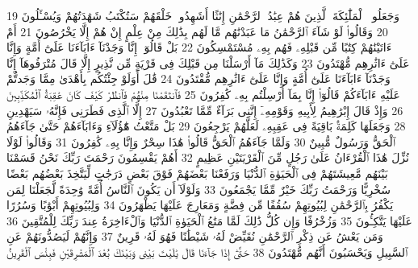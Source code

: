 {\tiny\colorbox{cl_aya}{19}} وَجَعَلُوا۟ ٱلْمَلَٰٓئِكَةَ ٱلَّذِينَ هُمْ عِبَٰدُ ٱلرَّحْمَٰنِ إِنَٰثًا أَشَهِدُوا۟ خَلْقَهُمْ سَتُكْتَبُ شَهَٰدَتُهُمْ وَيُسْـَٔلُونَ
{\tiny\colorbox{cl_aya}{20}} وَقَالُوا۟ لَوْ شَآءَ ٱلرَّحْمَٰنُ مَا عَبَدْنَٰهُم مَّا لَهُم بِذَٰلِكَ مِنْ عِلْمٍ إِنْ هُمْ إِلَّا يَخْرُصُونَ
{\tiny\colorbox{cl_aya}{21}} أَمْ ءَاتَيْنَٰهُمْ كِتَٰبًا مِّن قَبْلِهِۦ فَهُم بِهِۦ مُسْتَمْسِكُونَ
{\tiny\colorbox{cl_aya}{22}} بَلْ قَالُوٓا۟ إِنَّا وَجَدْنَآ ءَابَآءَنَا عَلَىٰٓ أُمَّةٍ وَإِنَّا عَلَىٰٓ ءَاثَٰرِهِم مُّهْتَدُونَ
{\tiny\colorbox{cl_aya}{23}} وَكَذَٰلِكَ مَآ أَرْسَلْنَا مِن قَبْلِكَ فِى قَرْيَةٍ مِّن نَّذِيرٍ إِلَّا قَالَ مُتْرَفُوهَآ إِنَّا وَجَدْنَآ ءَابَآءَنَا عَلَىٰٓ أُمَّةٍ وَإِنَّا عَلَىٰٓ ءَاثَٰرِهِم مُّقْتَدُونَ
{\tiny\colorbox{cl_aya}{24}} قَٰلَ أَوَلَوْ جِئْتُكُم بِأَهْدَىٰ مِمَّا وَجَدتُّمْ عَلَيْهِ ءَابَآءَكُمْ قَالُوٓا۟ إِنَّا بِمَآ أُرْسِلْتُم بِهِۦ كَٰفِرُونَ
{\tiny\colorbox{cl_aya}{25}} فَٱنتَقَمْنَا مِنْهُمْ فَٱنظُرْ كَيْفَ كَانَ عَٰقِبَةُ ٱلْمُكَذِّبِينَ
{\tiny\colorbox{cl_aya}{26}} وَإِذْ قَالَ إِبْرَٰهِيمُ لِأَبِيهِ وَقَوْمِهِۦٓ إِنَّنِى بَرَآءٌ مِّمَّا تَعْبُدُونَ
{\tiny\colorbox{cl_aya}{27}} إِلَّا ٱلَّذِى فَطَرَنِى فَإِنَّهُۥ سَيَهْدِينِ
{\tiny\colorbox{cl_aya}{28}} وَجَعَلَهَا كَلِمَةًۢ بَاقِيَةً فِى عَقِبِهِۦ لَعَلَّهُمْ يَرْجِعُونَ
{\tiny\colorbox{cl_aya}{29}} بَلْ مَتَّعْتُ هَٰٓؤُلَآءِ وَءَابَآءَهُمْ حَتَّىٰ جَآءَهُمُ ٱلْحَقُّ وَرَسُولٌ مُّبِينٌ
{\tiny\colorbox{cl_aya}{30}} وَلَمَّا جَآءَهُمُ ٱلْحَقُّ قَالُوا۟ هَٰذَا سِحْرٌ وَإِنَّا بِهِۦ كَٰفِرُونَ
{\tiny\colorbox{cl_aya}{31}} وَقَالُوا۟ لَوْلَا نُزِّلَ هَٰذَا ٱلْقُرْءَانُ عَلَىٰ رَجُلٍ مِّنَ ٱلْقَرْيَتَيْنِ عَظِيمٍ
{\tiny\colorbox{cl_aya}{32}} أَهُمْ يَقْسِمُونَ رَحْمَتَ رَبِّكَ نَحْنُ قَسَمْنَا بَيْنَهُم مَّعِيشَتَهُمْ فِى ٱلْحَيَوٰةِ ٱلدُّنْيَا وَرَفَعْنَا بَعْضَهُمْ فَوْقَ بَعْضٍ دَرَجَٰتٍ لِّيَتَّخِذَ بَعْضُهُم بَعْضًا سُخْرِيًّا وَرَحْمَتُ رَبِّكَ خَيْرٌ مِّمَّا يَجْمَعُونَ
{\tiny\colorbox{cl_aya}{33}} وَلَوْلَآ أَن يَكُونَ ٱلنَّاسُ أُمَّةً وَٰحِدَةً لَّجَعَلْنَا لِمَن يَكْفُرُ بِٱلرَّحْمَٰنِ لِبُيُوتِهِمْ سُقُفًا مِّن فِضَّةٍ وَمَعَارِجَ عَلَيْهَا يَظْهَرُونَ
{\tiny\colorbox{cl_aya}{34}} وَلِبُيُوتِهِمْ أَبْوَٰبًا وَسُرُرًا عَلَيْهَا يَتَّكِـُٔونَ
{\tiny\colorbox{cl_aya}{35}} وَزُخْرُفًا وَإِن كُلُّ ذَٰلِكَ لَمَّا مَتَٰعُ ٱلْحَيَوٰةِ ٱلدُّنْيَا وَٱلْءَاخِرَةُ عِندَ رَبِّكَ لِلْمُتَّقِينَ
{\tiny\colorbox{cl_aya}{36}} وَمَن يَعْشُ عَن ذِكْرِ ٱلرَّحْمَٰنِ نُقَيِّضْ لَهُۥ شَيْطَٰنًا فَهُوَ لَهُۥ قَرِينٌ
{\tiny\colorbox{cl_aya}{37}} وَإِنَّهُمْ لَيَصُدُّونَهُمْ عَنِ ٱلسَّبِيلِ وَيَحْسَبُونَ أَنَّهُم مُّهْتَدُونَ
{\tiny\colorbox{cl_aya}{38}} حَتَّىٰٓ إِذَا جَآءَنَا قَالَ يَٰلَيْتَ بَيْنِى وَبَيْنَكَ بُعْدَ ٱلْمَشْرِقَيْنِ فَبِئْسَ ٱلْقَرِينُ
